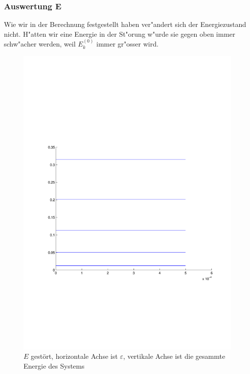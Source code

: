 \begin{refsection}
\subsubsection{Auswertung E}

Wie wir in der Berechnung festgestellt haben ver"andert sich der Energiezustand nicht.
H"atten wir eine Energie in der St"orung w"urde sie gegen oben immer schw"acher werden, weil $E_k^{(0)}$ immer gr"osser wird.

\begin{figure}
 \centering
 \includegraphics[width=12cm,clip=true,trim=2cm 7cm 1cm 8cm]{efeld/Energie_gestoert.pdf}
 \caption{$E$ gest\"ort, horizontale Achse ist $\varepsilon$, vertikale Achse ist die gesammte Energie des Systems}
 \label{abb:efeld_E_gestoert}
\end{figure}





\printbibliography[heading=subbibliography]
\end{refsection}

